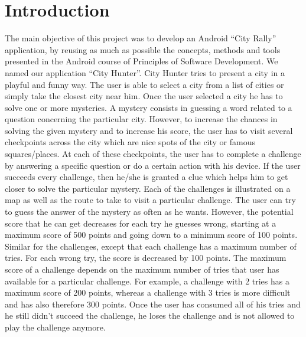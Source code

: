 \chapter{Introduction}

The main objective of this project was to develop an Android ``City Rally'' application, by reusing as much as possible the concepts, methods and tools presented in the Android course of Principles of Software Development. We named our application ``City Hunter''. City Hunter tries to present a city in a playful and funny way. The user is able to select a city from a list of cities or simply take the closest city near him. Once the user selected a city he has to solve one or more mysteries. A mystery consists in guessing a word related to a question concerning the particular city. However, to increase the chances in solving the given mystery and to increase his score, the user has to visit several checkpoints across the city which are nice spots of the city or famous squares/places. At each of these checkpoints, the user has to complete a challenge by answering a specific question or do a certain action with his device. If the user succeeds every challenge, then he/she is granted a clue which helps him to get closer to solve the particular mystery. Each of the challenges is illustrated on a map as well as the route to take to visit a particular challenge. The user can try to guess the answer of the mystery as often as he wants. However, the potential score that he can get decreases for each try he guesses wrong, starting at a maximum score of 500 points and going down to a minimum score of 100 points. Similar for the challenges, except that each challenge has a maximum number of tries. For each wrong try, the score is decreased by 100 points. The maximum score of a challenge depends on the maximum number of tries that user has available for a particular challenge. For example, a challenge with 2 tries has a maximum score of 200 points, whereas a challenge with 3 tries is more difficult and has also therefore 300 points. Once the user has consumed all of his tries and he still didn't succeed the challenge, he loses the challenge and is not allowed to play the challenge anymore.